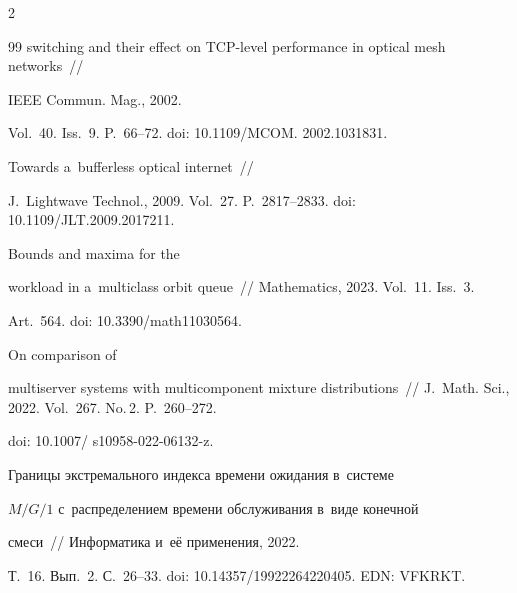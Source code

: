 \begin{multicols}{2}
{{\begin{thebibliography}{99}
{switching and their effect on TCP-level performance in optical mesh networks}~//


IEEE Commun. Mag., 2002.


Vol.~40. Iss.~9. P.~66--72. doi: 10.1109/MCOM. 2002.1031831.









{Towards a~bufferless optical internet}~//


J.~Lightwave Technol., 2009. Vol.~27. P.~2817--2833. doi: 10.1109/JLT.2009.2017211.







 Bounds and maxima for the 


workload in a~multiclass orbit queue~// Mathematics, 2023. Vol.~11. Iss.~3. 


Art.~564. doi: 10.3390/math11030564.







 On comparison of 


multiserver systems with multicomponent mixture distributions~// J.~Math. Sci., 2022. Vol.~267. No.\,2. P.~260--272.


doi: 10.1007/ s10958-022-06132-z. 









Границы экстремального индекса времени ожидания в~системе


$M/G/1$ с~распределением времени обслуживания в~виде конечной


смеси~// Информатика и~её применения, 2022.


Т.~16. Вып.~2. С.~26--33. doi: 10.14357/19922264220405. EDN: VFKRKT.














\end{thebibliography}}}
\end{multicols}
